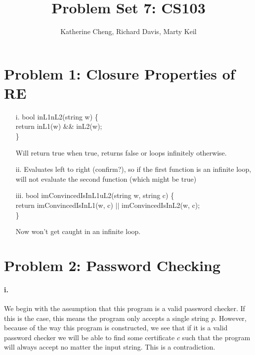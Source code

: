 \documentclass[10pt,letter]{article}
\begin{document}

\title{Problem Set 7: CS103}

\author{Katherine Cheng, Richard Davis, Marty Keil}

 
\maketitle

\section*{Problem 1: Closure Properties of RE}

\begin{enumerate}
\item[i.] 
bool inL1nL2(string w) \{\\
return inL1(w) \&\& inL2(w);\\
\}

Will return true when true, returns false or loops infinitely otherwise.
\item[ii.] Evaluates left to right (confirm?), so if the first function is an infinite loop, will not evaluate the second function (which might be true)
\item[iii.] 
bool imConvincedIsInL1uL2(string w, string c) \{\\
return imConvincedIsInL1(w, c) $||$  imConvincedIsInL2(w, c);\\
\}

Now won't get caught in an infinite loop.
\end{enumerate}

\section*{Problem 2: Password Checking}

\paragraph{i.} We begin with the assumption that this program is a valid password checker. If this is the case, this means the program only accepts a single string $p$. However, because of the way this program is constructed, we see that if it is a valid password checker we will be able to find some certificate $c$ such that the program will always accept no matter the input string. This is a contradiction.
\end{document}
